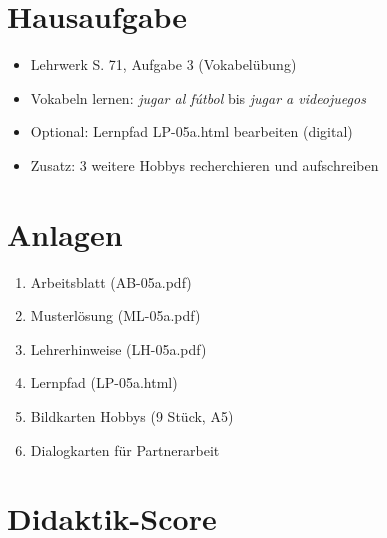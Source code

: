 \documentclass[11pt,a4paper]{article}
\begin{document}
\section{Hausaufgabe}

\begin{itemize}
    \item Lehrwerk S. 71, Aufgabe 3 (Vokabelübung)
    \item Vokabeln lernen: \textit{jugar al fútbol} bis \textit{jugar a videojuegos}
    \item Optional: Lernpfad LP-05a.html bearbeiten (digital)
    \item [E] Zusatz: 3 weitere Hobbys recherchieren und aufschreiben
\end{itemize}

\section{Anlagen}

\begin{enumerate}
    \item Arbeitsblatt (AB-05a.pdf)
    \item Musterlösung (ML-05a.pdf)
    \item Lehrerhinweise (LH-05a.pdf)
    \item Lernpfad (LP-05a.html)
    \item Bildkarten Hobbys (9 Stück, A5)
    \item Dialogkarten für Partnerarbeit
\end{enumerate}

\newpage
\section{Didaktik-Score}
\end{document}
